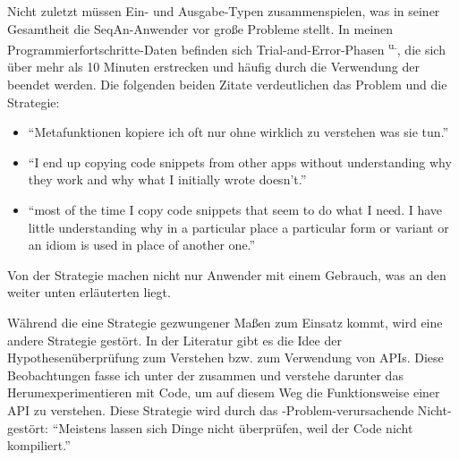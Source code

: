\begin{itemize}
\begin{description}
\begin{description}
      Nicht zuletzt müssen Ein- und Ausgabe-Typen zusammenspielen, was in seiner Gesamtheit die SeqAn-Anwender vor große Probleme stellt. In meinen Programmierfortschritte-Daten befinden sich Trial-and-Error-Phasen\textsuperscript{ u.}, die sich über mehr als 10 Minuten erstrecken und häufig durch die Verwendung der   beendet werden. Die folgenden beiden Zitate verdeutlichen das Problem und die Strategie:
      \begin{itemize}
        \item ``Metafunktionen kopiere ich oft nur ohne wirklich zu verstehen was sie tun.''
        \item ``I end up copying code snippets from other apps without understanding why they work and why what I initially wrote doesn’t.''
        \item ``most of the time I copy code snippets that seem to do what I need. I have little understanding why in a particular place a particular form or variant or an idiom is used in place of another one.''
      \end{itemize}
      
      Von der Strategie  machen nicht nur Anwender mit einem  Gebrauch, was an den weiter unten erläuterten  liegt.
      
      Während die eine Strategie gezwungener Maßen zum Einsatz kommt, wird eine andere Strategie gestört. In der Literatur gibt es die Idee der Hypothesenüberprüfung zum Verstehen \citep[siehe ,][]{Brooks:1983fj} bzw. zum Verwendung \citep[siehe ,][]{161956,Green:1996gm,Green:1989wb} von APIs. Diese Beobachtungen fasse ich unter der   zusammen und verstehe darunter das Herumexperimentieren mit Code, um auf diesem Weg die Funktionsweise einer API zu verstehen. Diese Strategie wird durch das -Problem-verursachende Nicht- gestört: ``Meistens lassen sich Dinge nicht überprüfen, weil der Code nicht kompiliert.''
      

\end{description}
\end{description}
\end{itemize}
